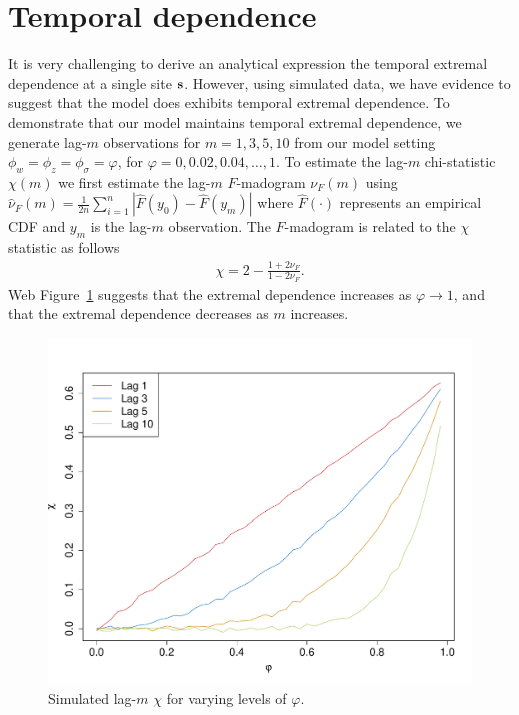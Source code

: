 \documentclass[useAMS,usenatbib,referee]{biomweb}
\renewcommand{\fref}[1]{Web Figure~\ref{#1}}
\begin{document}
\section{Temporal dependence} \label{sta:temporal}
It is very challenging to derive an analytical expression the temporal extremal dependence at a single site $\mbox{\bf s}$.
However, using simulated data, we have evidence to suggest that the model does exhibits temporal extremal dependence.
To demonstrate that our model maintains temporal extremal dependence, we generate lag-$m$ observations for $m = 1, 3, 5, 10$ from our model setting $\phi_w = \phi_z = \phi_\sigma = \varphi$, for $\varphi = 0, 0.02, 0.04, \ldots, 1$.
To estimate the lag-$m$ chi-statistic $\chi(m)$ we first estimate the lag-$m$ $F$-madogram $\nu_F(m)$ \citep{Cooley2006} using $\hat{\nu}_F(m) = \frac{1}{2n} \sum_{i = 1}^n | \hat{F}(y_{0}) - \hat{F}(y_{m})|$ where $\hat{F}(\cdot)$ represents an empirical CDF and $y_m$ is the lag-$m$ observation.
The $F$-madogram is related to the $\chi$ statistic as follows
\begin{align}
  \chi = 2 - \frac{1 + 2 \nu_F}{1 - 2 \nu_F}.
\end{align}
\fref{stfig:chiphi} suggests that the extremal dependence increases as $\varphi \rightarrow 1$, and that the extremal dependence decreases as $m$ increases.
\begin{figure}
  \centering
  \includegraphics[width=\linewidth]{plots/chi-phi}
  \caption{Simulated lag-$m$ $\chi$ for varying levels of $\varphi$.}
  \label{stfig:chiphi}
\end{figure}
\end{document}
